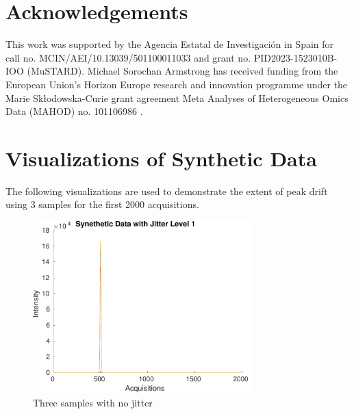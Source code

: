 \documentclass[preprint,12pt]{elsarticle}
\begin{document}
\section{Acknowledgements}

This work was supported by the Agencia Estatal de Investigación in Spain for call no. MCIN/AEI/10.13039/501100011033 and grant no. PID2023-1523010B-IOO (MuSTARD). Michael Sorochan Armstrong has received funding from the European Union's Horizon Europe research and innovation programme under the Marie Skłodowska-Curie grant agreement Meta Analyses of Heterogeneous Omics Data (MAHOD) no. 101106986 .




\appendix

\section{Visualizations of Synthetic Data}\label{sec:vis}

The following visualizations are used to demonstrate the extent of peak drift using 3 samples for the first 2000 acquisitions.

\begin{figure}[h]
    \centering
    \includegraphics[width=0.75\textwidth]{figures/jitter_illustration1.pdf}
    \caption{Three samples with no jitter}
    \label{fig:figure1}
\end{figure}
\end{document}
